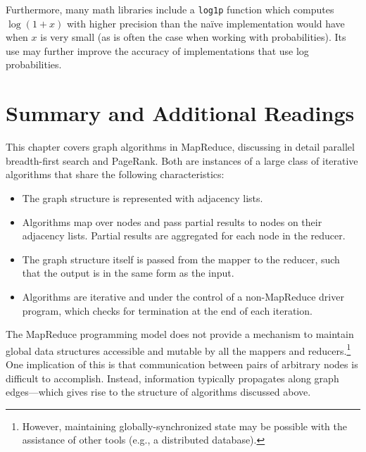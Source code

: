 \noindent Furthermore, many math libraries include a \texttt{log1p}
function which computes $\log(1+x)$ with higher precision than the
na\"{i}ve implementation would have when $x$ is very small (as is
often the case when working with probabilities).  Its use may further
improve the accuracy of implementations that use log probabilities.

\section{Summary and Additional Readings}

This chapter covers graph algorithms in MapReduce, discussing in
detail parallel breadth-first search and PageRank.  Both are instances
of a large class of iterative algorithms that share the following
characteristics:

\begin{itemize}

\item The graph structure is represented with adjacency lists.

\item Algorithms map over nodes and pass partial results to nodes on
  their adjacency lists.  Partial results are aggregated for each node
  in the reducer.

\item The graph structure itself is passed from the mapper to the
  reducer, such that the output is in the same form as the input.

\item Algorithms are iterative and under the control of a
  non-MapReduce driver program, which checks for termination at the
  end of each iteration.

\end{itemize}

\noindent The MapReduce programming model does not provide a mechanism
to maintain global data structures accessible and mutable by all the
mappers and reducers.\footnote{However, maintaining
  globally-synchronized state may be possible with the assistance of
  other tools (e.g., a distributed database).} One implication of this
is that communication between pairs of arbitrary nodes is difficult to
accomplish.  Instead, information typically propagates along graph
edges---which gives rise to the structure of algorithms discussed
above.

